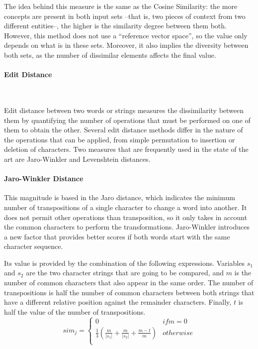 The idea behind this measure is the same as the Cosine Similarity: the more concepts are present in both input sets --that is, two pieces of context from two different entities--, the higher is the similarity degree between them both. However, this method does not use a ``reference vector space'', so the value only depends on what is in these sets. Moreover, it also implies the diversity between both sets, as the number of dissimilar elements affects the final value.

\paragraph{Edit Distance}~

Edit distance between two words or strings measures the dissimilarity between them by quantifying the number of operations that must be performed on one of them to obtain the other. Several edit distance methods differ in the nature of the operations that can be applied, from simple permutation to insertion or deletion of characters. Two measures that are frequently used in the state of the art are Jaro-Winkler and Levenshtein distances.

\paragraph{Jaro-Winkler Distance}

This magnitude is based in the Jaro distance, which indicates the minimum number of transpositions of a single character to change a word into another. It does not permit other operations than transposition, so it only takes in account the common characters to perform the transformations. Jaro-Winkler introduces a new factor that provides better scores if both words start with the same character sequence.

Its value is provided by the combination of the following expressions. Variables $s_1$ and $s_2$ are the two character strings that are going to be compared, and $m$ is the number of common characters that also appear in the same order. The number of transpositions is half the number of common characters between both strings that have a different relative position against the remainder characters. Finally, $t$ is half the value of the number of transpositions.
%
\begin{equation}
sim_j = \begin{cases}
		0 & if m=0 \\
		\frac{1}{3}\left( \frac{m}{|s_1|} + \frac{m}{|s_2|} + \frac{m-t}{m} \right) & otherwise \\
	\end{cases}
\label{eq:jaro}
\end{equation}

